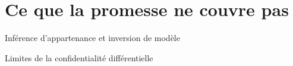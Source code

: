 \section{Ce que la promesse ne couvre pas}

\begin{frame}{Inférence d'appartenance et inversion de modèle}
\end{frame}

\begin{frame}{Limites de la confidentialité différentielle}
\end{frame}

